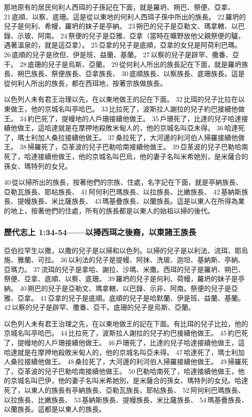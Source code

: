 那地原有的居民何利人西珥的子孫記在下面，就是羅坍、朔巴、祭便、亞拿、 21 底順、以察、底珊。這是從以東地的何利人西珥子孫中所出的族長。 22 羅坍的兒子是何利、希幔，羅坍的妹子是亭納。 23 朔巴的兒子是亞勒文、瑪拿轄、以巴錄、示玻、阿南。 24 祭便的兒子是亞雅、亞拿（當時在曠野放他父親祭便的驢，遇著溫泉的，就是這亞拿）。 25 亞拿的兒子是底順，亞拿的女兒是阿荷利巴瑪。 26 底順的兒子是欣但、伊是班、益蘭、基蘭。 27 以察的兒子是辟罕、撒番、亞干。 28 底珊的兒子是烏斯、亞蘭。 29 從何利人所出的族長記在下面，就是羅坍族長、朔巴族長、祭便族長、亞拿族長、 30 底順族長、以察族長、底珊族長。這是從何利人所出的族長，都在西珥地，按著宗族做族長。

以色列人未有君王治理以先，在以東地做王的記在下面。 32 比珥的兒子比拉在以東做王，他的京城名叫亭哈巴。 33 比拉死了，波斯拉人謝拉的兒子約巴接續他做王。 34 約巴死了，提幔地的人戶珊接續他做王。 35 戶珊死了，比達的兒子哈達接續他做王，這哈達就是在摩押地殺敗米甸人的，他的京城名叫亞未得。 36 哈達死了，瑪士利加人桑拉接續他做王。 37 桑拉死了，大河邊的利河伯人掃羅接續他做王。 38 掃羅死了，亞革波的兒子巴勒哈南接續他做王。 39 亞革波的兒子巴勒哈南死了，哈達接續他做王，他的京城名叫巴烏，他的妻子名叫米希她別，是米薩合的孫女、瑪特列的女兒。

40 從以掃所出的族長，按著他們的宗族、住處，名字記在下面，就是亭納族長、亞勒瓦族長、耶帖族長、 41 阿何利巴瑪族長、以拉族長、比嫩族長、 42 基納斯族長、提幔族長、米比薩族長、 43 瑪基疊族長、以蘭族長。這是以東人在所得為業的地上，按著他們的住處，所有的族長都是以東人的始祖以掃的後代。

\subsubsection{歷代志上 1:34-54——以掃西珥之後裔，以東諸王族長}
亞伯拉罕生以撒，以撒的兒子是以掃和以色列。以掃的兒子是以利法、流珥、耶烏施、雅蘭、可拉。 36 以利法的兒子是提幔、阿抹、洗玻、迦坦、基納斯、亭納、亞瑪力。 37 流珥的兒子是拿哈、謝拉、沙瑪、米撒。西珥的兒子是羅坍、朔巴、祭便、亞拿、底順、以察、底珊。 39 羅坍的兒子是何利、荷幔，羅坍的妹子是亭納。 40 朔巴的兒子是亞勒文、瑪拿轄、以巴錄、示非、阿南。祭便的兒子是亞雅、亞拿。 41 亞拿的兒子是底順。底順的兒子是哈默蘭、伊是班、益蘭、基蘭。 42 以察的兒子是辟罕、撒番、亞干。底珊的兒子是烏斯、亞蘭。

以色列人未有君王治理之先，在以東地做王的記在下面。有比珥的兒子比拉，他的京城名叫亭哈巴。 44 比拉死了，波斯拉人謝拉的兒子約巴接續他做王。 45 約巴死了，提幔地的人戶珊接續他做王。 46 戶珊死了，比達的兒子哈達接續他做王，這哈達就是在摩押地殺敗米甸人的，他的京城名叫亞未得。 47 哈達死了，瑪士利加人桑拉接續他做王。 48 桑拉死了，大河邊的利河伯人掃羅接續他做王。 49 掃羅死了，亞革波的兒子巴勒哈南接續他做王。 50 巴勒哈南死了，哈達接續他做王，他的京城名叫巴伊，他的妻子名叫米希她別，是米薩合的孫女、瑪特列的女兒。哈達死了，以東人的族長有亭納族長、亞勒瓦族長、耶帖族長、 52 阿何利巴瑪族長、以拉族長、比嫩族長、 53 基納斯族長、提幔族長、米比薩族長、 54 瑪基疊族長、以蘭族長。這都是以東人的族長。


